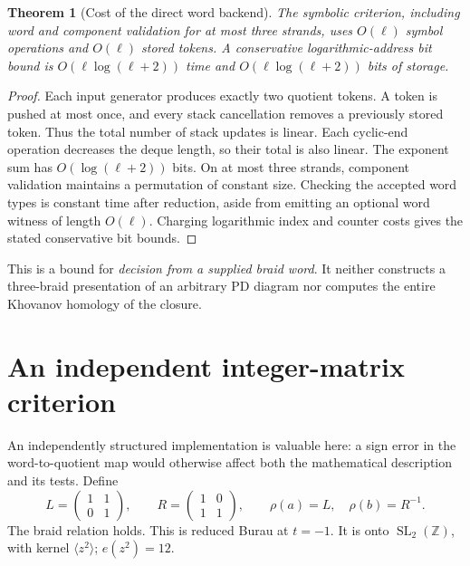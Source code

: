 \documentclass[11pt,letterpaper]{article}
\newtheorem{theorem}{Theorem}[section]
\theoremstyle{definition}
\newcommand{\Z}{\mathbb Z}
\newcommand{\SL}{\operatorname{SL}}
\begin{document}
\begin{theorem}[Cost of the direct word backend]
\label{thm:linear}
The symbolic criterion, including word and component validation for at
most three strands, uses \(O(\ell)\) symbol operations and
\(O(\ell)\) stored tokens. A conservative logarithmic-address bit bound is
\(O(\ell\log(\ell+2))\) time and \(O(\ell\log(\ell+2))\) bits of storage.
\end{theorem}
\begin{proof}
Each input generator produces exactly two quotient tokens. A token is
pushed at most once, and every stack cancellation removes a previously
stored token. Thus the total number of stack updates is linear.
Each cyclic-end operation decreases the deque length, so their total is
also linear. The exponent sum has \(O(\log(\ell+2))\) bits.
On at most three strands, component validation maintains a permutation of
constant size. Checking the accepted word types is constant time after
reduction, aside from emitting an optional word witness of length
\(O(\ell)\). Charging logarithmic index and counter costs gives the stated
conservative bit bounds.
\end{proof}

This is a bound for \emph{decision from a supplied braid word}. It neither
constructs a three-braid presentation of an arbitrary PD diagram nor
computes the entire Khovanov homology of the closure.

\section{An independent integer-matrix criterion}
\label{sec:matrix}

An independently structured implementation is valuable here: a sign error
in the word-to-quotient map would otherwise affect both the mathematical
description and its tests. Define
\[
 L=\begin{pmatrix}1&1\\0&1\end{pmatrix},\qquad
 R=\begin{pmatrix}1&0\\1&1\end{pmatrix},\qquad
 \rho(a)=L,\quad \rho(b)=R^{-1}.
\]
The braid relation holds. This is reduced Burau at \(t=-1\).
It is onto \(\SL_2(\Z)\), with kernel
\(\langle z^2\rangle\); \(e(z^2)=12\).
\end{document}
